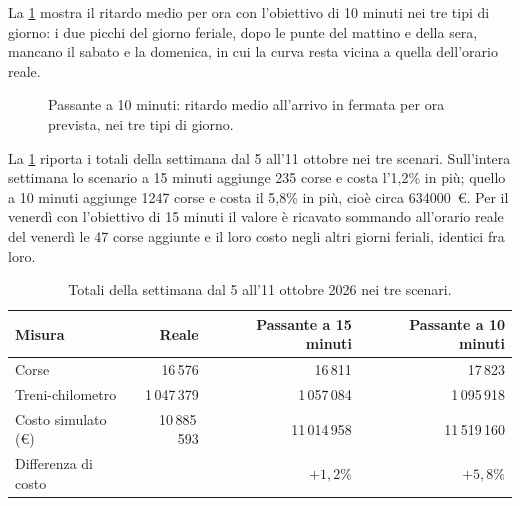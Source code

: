La \cref{fig:passante-confronto-giorni} mostra il ritardo medio per ora con l'obiettivo di 10 minuti nei tre tipi di giorno: i due picchi del giorno feriale, dopo le punte del mattino e della sera, mancano il sabato e la domenica, in cui la curva resta vicina a quella dell'orario reale.

\begin{figure}[H]
	\centering
	\caption{Passante a 10 minuti: ritardo medio all'arrivo in fermata per ora prevista, nei tre tipi di giorno.}
	\label{fig:passante-confronto-giorni}
\end{figure}

La \cref{tab:risultati-settimana} riporta i totali della settimana dal 5 all'11 ottobre nei tre scenari. Sull'intera settimana lo scenario a 15 minuti aggiunge 235 corse e costa l'1,2\% in più; quello a 10 minuti aggiunge 1247 corse e costa il 5,8\% in più, cioè circa \SI{634000}{\euro}. Per il venerdì con l'obiettivo di 15 minuti il valore è ricavato sommando all'orario reale del venerdì le 47 corse aggiunte e il loro costo negli altri giorni feriali, identici fra loro.

\begin{table}[H]
	\centering
	\caption{Totali della settimana dal 5 all'11 ottobre 2026 nei tre scenari.}
	\label{tab:risultati-settimana}
	\begin{tabularx}{\textwidth}{Xrrr}
		\toprule
		Misura & Reale & Passante a 15 minuti & Passante a 10 minuti \\
		\midrule
		Corse & 16\,576 & 16\,811 & 17\,823 \\
		Treni-chilometro & 1\,047\,379 & 1\,057\,084 & 1\,095\,918 \\
		Costo simulato (\euro) & 10\,885\,593 & 11\,014\,958 & 11\,519\,160 \\
		Differenza di costo & & $+1{,}2\%$ & $+5{,}8\%$ \\
		\bottomrule
	\end{tabularx}
\end{table}

